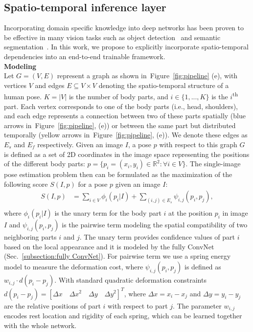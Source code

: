 \documentclass[10pt,twocolumn,letterpaper]{article}
\newcommand{\figref}[1]{Figure~\ref{#1}}
\newcommand{\secref}[1]{Sec.~\ref{#1}}
\begin{document}
\subsection{Spatio-temporal inference layer}\noindent Incorporating domain specific knowledge into deep networks has been proven to be effective in many vision tasks such as object detection~\cite{girshick2015deformable} and semantic segmentation~\cite{zheng2015conditional}. In this work, we propose to explicitly incorporate spatio-temporal dependencies into an end-to-end trainable framework.\\

\noindent\textbf{Modeling}\\
Let $G = (V,E)$ represent a graph as shown in~\figref{fig:pipeline} (e), with vertices $V$ and edges $E \subseteq  V \times V$ denoting the spatio-temporal structure of a human pose. $K = |V|$ is the number of body parts, and $i \in \{1,...,K\}$ is the $i$\textsuperscript{th} part. Each vertex corresponds to one of the body parts (i.e., head, shoulders), and each edge represents a connection between two of these parts spatially (blue arrows in~\figref{fig:pipeline}, (e)) or between the same part but distributed temporally (yellow arrows in~\figref{fig:pipeline}, (e)). We denote these edges as $E_s$ and $E_f$ respectively. Given an image $I$, a pose $p$ with respect to this graph $G$ is defined as a set of 2D coordinates in the image space representing the positions of the different body parts: $p = \{p_i = (x_i,y_i) \in  \mathbb{R}^2 : \forall i \in V\}$.
The single-image pose estimation problem then can be formulated
as the maximization of the following score $S(I,p)$ for a pose $p$ given an image $I$:
\begin{equation}
\begin{aligned}\label{equation:scorePose}
S(I,p) &= \sum_{i \in V}\phi_{i}(p_i| I) + \sum_{(i,j)\in E_s} \psi_{i,j}(p_i, p_j),\\
\end{aligned}
\end{equation}
where $\phi_{i}(p_i| I)$ is the unary term for the body part $i$ at
the position $p_i$ in image $I$ and $\psi_{i,j}(p_i, p_j)$ is the pairwise term modeling the spatial compatibility of two neighboring parts $i$ and $j$. The unary term provides confidence values of part $i$ based on the local appearance and it is modeled by the fully ConvNet (\secref{subsection:fully ConvNet}). For pairwise term we use a spring energy model to measure the deformation cost, where $\psi_{i,j}(p_i, p_j)$ is defined as $w_{i,j}\cdot d(p_i-p_j)$. With standard quadratic deformation constraints $d(p_i-p_j) = [\Delta x \quad \Delta x^2 \quad \Delta y \quad \Delta y^2]^T$, where $\Delta x = x_i - x_j$ and $\Delta y = y_i - y_j$ are the relative positions of part $i$ with respect to part $j$. The parameter $w_{i,j}$ encodes rest location and rigidity of each spring, which can be learned together with the whole network.
\end{document}
